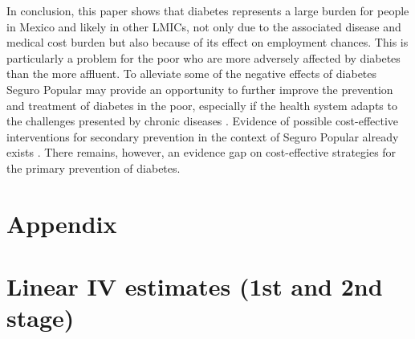 In conclusion, this paper shows that diabetes represents
a large burden for people in Mexico and likely in other \acp{LMIC},
not only due to the associated disease and medical cost burden but
also because of its effect on employment chances. This is particularly
a problem for the poor who are more adversely affected by diabetes
than the more affluent. To alleviate some of the negative effects
of diabetes Seguro Popular may provide an opportunity to further improve
the prevention and treatment of diabetes in the poor, especially if
the health system adapts to the challenges presented by chronic diseases
\parencite{Samb2010}. Evidence of possible cost-effective interventions
for secondary prevention in the context of Seguro Popular already
exists \parencite{Salomon2012}. There remains, however, an evidence gap
on cost-effective strategies for the primary prevention of diabetes.

\clearpage


\section*{Appendix}


\section{\label{sec:Lewbel-and-linear}Linear IV estimates (1st and 2nd stage)}


